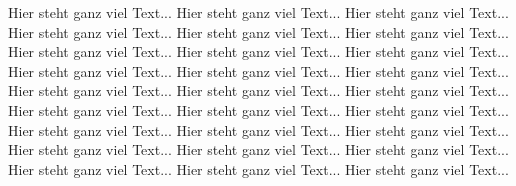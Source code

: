 Hier steht ganz viel Text... Hier steht ganz viel Text... Hier steht ganz viel Text... Hier steht ganz viel Text... Hier steht ganz viel Text... Hier steht ganz viel Text... Hier steht ganz viel Text... Hier steht ganz viel Text... Hier steht ganz viel Text... Hier steht ganz viel Text... Hier steht ganz viel Text... Hier steht ganz viel Text... Hier steht ganz viel Text... Hier steht ganz viel Text... Hier steht ganz viel Text... Hier steht ganz viel Text... Hier steht ganz viel Text... Hier steht ganz viel Text... Hier steht ganz viel Text... Hier steht ganz viel Text... Hier steht ganz viel Text... Hier steht ganz viel Text... Hier steht ganz viel Text... Hier steht ganz viel Text... Hier steht ganz viel Text... Hier steht ganz viel Text... Hier steht ganz viel Text... 